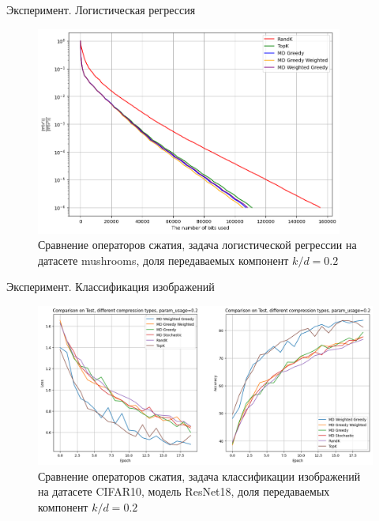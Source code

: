 \documentclass{beamer}
\begin{document}
\begin{frame}{Эксперимент. Логистическая регрессия}

    \begin{figure}
     \centering
     \includegraphics[width=0.9\textwidth]{../figures/LogReg}
     \caption{Сравнение операторов сжатия, задача логистической регрессии на датасете mushrooms, доля передаваемых компонент $k/d = 0.2$}
    \end{figure}

\end{frame}


\begin{frame}{Эксперимент. Классификация изображений}

    \begin{figure}
     \centering
     \includegraphics[width=\textwidth]{../figures/ResNet_CIFAR10}
     \caption{Сравнение операторов сжатия, задача классификации изображений на датасете CIFAR10, модель ResNet18, доля передаваемых компонент $k/d = 0.2$}
    \end{figure}

\end{frame}
\end{document}

